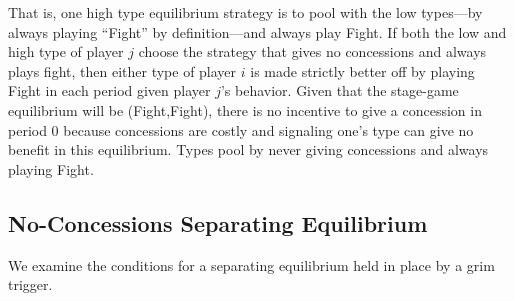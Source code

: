 \documentclass[12pt, letterpaper]{article}
\begin{document}
That is, one high type equilibrium strategy is to pool with the low types---by always playing ``Fight'' by definition---and always play Fight. If both the low and high type of player $j$ choose the strategy that gives no concessions and always plays fight, then either type of player $i$ is made strictly better off by playing Fight in each period given player $j$'s behavior. Given that the stage-game equilibrium will be (Fight,Fight), there is no incentive to give a concession in period 0 because concessions are costly and signaling one's type can give no benefit in this equilibrium. Types pool by never giving concessions and always playing Fight. 
 
\subsection{No-Concessions Separating Equilibrium}
 
 We examine the conditions for a separating equilibrium held in place by a grim trigger.
 
\end{document}
